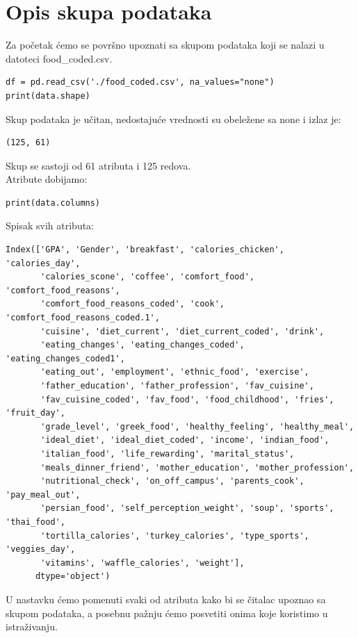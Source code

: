 \documentclass[12pt,a4paper]{article}
\begin{document}
\section{Opis skupa podataka}
Za po\v cetak \' cemo se povr\v sno upoznati sa skupom podataka koji se nalazi u datoteci food\_coded.csv.
\\
\begin{lstlisting}[mathescape=true]
df = pd.read_csv('./food_coded.csv', na_values="none")
print(data.shape)
\end{lstlisting}
Skup podataka je u\v citan, nedostaju\' ce vrednosti su obele\v zene sa none i izlaz je:
\begin{verbatim}
(125, 61)
\end{verbatim}
Skup se sastoji od 61 atributa i 125 redova.\\
Atribute dobijamo: 
\begin{lstlisting}[mathescape=true]
print(data.columns)
\end{lstlisting}
Spisak svih atributa:
\begin{verbatim}
Index(['GPA', 'Gender', 'breakfast', 'calories_chicken', 'calories_day',
       'calories_scone', 'coffee', 'comfort_food', 'comfort_food_reasons',
       'comfort_food_reasons_coded', 'cook', 'comfort_food_reasons_coded.1',
       'cuisine', 'diet_current', 'diet_current_coded', 'drink',
       'eating_changes', 'eating_changes_coded', 'eating_changes_coded1',
       'eating_out', 'employment', 'ethnic_food', 'exercise',
       'father_education', 'father_profession', 'fav_cuisine',
       'fav_cuisine_coded', 'fav_food', 'food_childhood', 'fries', 'fruit_day',
       'grade_level', 'greek_food', 'healthy_feeling', 'healthy_meal',
       'ideal_diet', 'ideal_diet_coded', 'income', 'indian_food',
       'italian_food', 'life_rewarding', 'marital_status',
       'meals_dinner_friend', 'mother_education', 'mother_profession',
       'nutritional_check', 'on_off_campus', 'parents_cook', 'pay_meal_out',
       'persian_food', 'self_perception_weight', 'soup', 'sports', 'thai_food',
       'tortilla_calories', 'turkey_calories', 'type_sports', 'veggies_day',
       'vitamins', 'waffle_calories', 'weight'],
      dtype='object')
\end{verbatim}

U nastavku \' cemo pomenuti svaki od atributa kako bi se \v citalac upoznao sa skupom podataka, a posebnu pa\v znju \' cemo posvetiti onima koje koristimo u istra\v zivanju.
\end{document}
